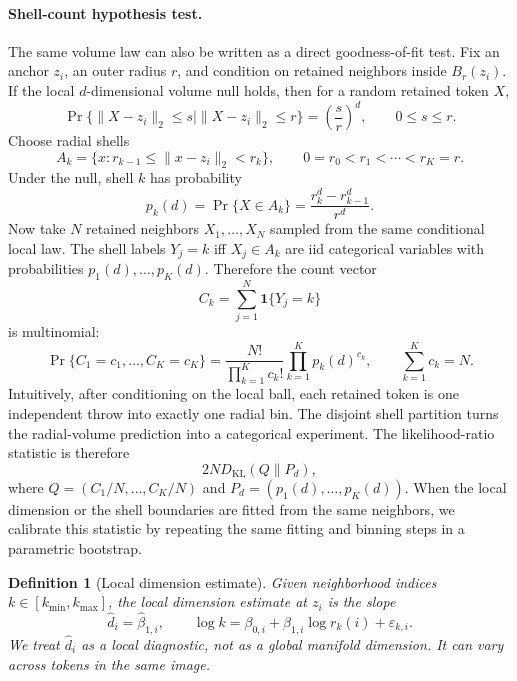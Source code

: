 \documentclass{article}
\newcommand{\dimhat}{\widehat{d}}
\newtheorem{definition}{Definition}
\begin{document}
\paragraph{Shell-count hypothesis test.}
The same volume law can also be written as a direct goodness-of-fit test. Fix
an anchor $z_i$, an outer radius $r$, and condition on retained neighbors
inside $B_r(z_i)$. If the local $d$-dimensional volume null holds, then for a
random retained token $X$,
\begin{equation}
  \Pr\{\|X-z_i\|_2\le s \mid \|X-z_i\|_2\le r\}
  =
  \left(\frac{s}{r}\right)^d,\qquad 0\le s\le r .
\end{equation}
Choose radial shells
\[
  A_k=\{x:r_{k-1}\le \|x-z_i\|_2<r_k\},\qquad
  0=r_0<r_1<\cdots<r_K=r .
\]
Under the null, shell $k$ has probability
\begin{equation}
  p_k(d)=\Pr\{X\in A_k\}
  =
  \frac{r_k^d-r_{k-1}^d}{r^d}.
\end{equation}
Now take $N$ retained neighbors $X_1,\ldots,X_N$ sampled from the same
conditional local law. The shell labels $Y_j=k$ iff $X_j\in A_k$ are iid
categorical variables with probabilities $p_1(d),\ldots,p_K(d)$. Therefore the
count vector
\[
  C_k=\sum_{j=1}^N \mathbf{1}\{Y_j=k\}
\]
is multinomial:
\begin{equation}
  \Pr\{C_1=c_1,\ldots,C_K=c_K\}
  =
  \frac{N!}{\prod_{k=1}^K c_k!}
  \prod_{k=1}^K p_k(d)^{c_k},
  \qquad \sum_{k=1}^K c_k=N.
\end{equation}
Intuitively, after conditioning on the local ball, each retained token is one
independent throw into exactly one radial bin. The disjoint shell partition
turns the radial-volume prediction into a categorical experiment. The
likelihood-ratio statistic is therefore
\[
  2N D_{\mathrm{KL}}(Q\|P_d),
\]
where $Q=(C_1/N,\ldots,C_K/N)$ and $P_d=(p_1(d),\ldots,p_K(d))$. When the local
dimension or the shell boundaries are fitted from the same neighbors, we
calibrate this statistic by repeating the same fitting and binning steps in a
parametric bootstrap.

\begin{definition}[Local dimension estimate]
Given neighborhood indices $k\in[k_{\min},k_{\max}]$, the local dimension estimate at $z_i$ is the slope
\begin{equation}
  \dimhat_i = \widehat{\beta}_{1,i},
  \qquad
  \log k = \beta_{0,i}+\beta_{1,i}\log r_k(i)+\varepsilon_{k,i}.
\end{equation}
We treat $\dimhat_i$ as a local diagnostic, not as a global manifold dimension. It can vary across tokens in the same image.
\end{definition}
\end{document}
